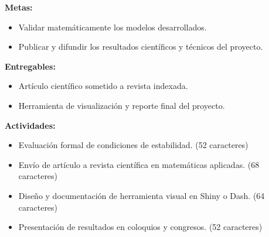 \documentclass[12pt]{article}
\begin{document}
\textbf{Metas:}
\begin{itemize}
  \item Validar matemáticamente los modelos desarrollados.
  \item Publicar y difundir los resultados científicos y técnicos del proyecto.
\end{itemize}

\textbf{Entregables:}
\begin{itemize}
  \item Artículo científico sometido a revista indexada.
  \item Herramienta de visualización y reporte final del proyecto.
\end{itemize}

\textbf{Actividades:}
\begin{itemize}
  \item Evaluación formal de condiciones de estabilidad. (52 caracteres)
  \item Envío de artículo a revista científica en matemáticas aplicadas. (68 caracteres)
  \item Diseño y documentación de herramienta visual en Shiny o Dash. (64 caracteres)
  \item Presentación de resultados en coloquios y congresos. (52 caracteres)
\end{itemize}
\end{document}
